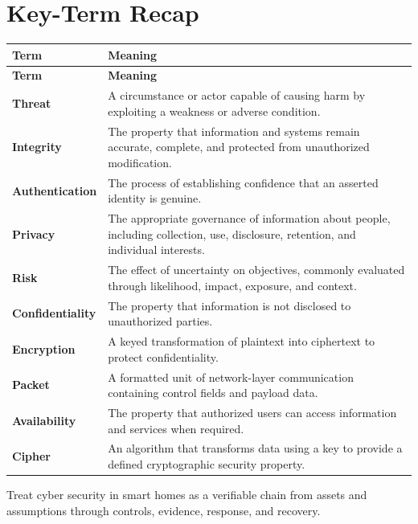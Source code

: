 \documentclass[11pt]{article}
\begin{document}
\section*{Key-Term Recap}
\begin{longtable}{>{\RaggedRight\arraybackslash}p{}>{\RaggedRight\arraybackslash}p{}}
\toprule\rowcolor{Navy}\color{white}\textbf{Term} & \color{white}\textbf{Meaning}\\\midrule
\endfirsthead
\toprule\rowcolor{Navy}\color{white}\textbf{Term} & \color{white}\textbf{Meaning}\\\midrule
\endhead
\textbf{Threat} & A circumstance or actor capable of causing harm by exploiting a weakness or adverse condition. \\\midrule
\textbf{Integrity} & The property that information and systems remain accurate, complete, and protected from unauthorized modification. \\\midrule
\textbf{Authentication} & The process of establishing confidence that an asserted identity is genuine. \\\midrule
\textbf{Privacy} & The appropriate governance of information about people, including collection, use, disclosure, retention, and individual interests. \\\midrule
\textbf{Risk} & The effect of uncertainty on objectives, commonly evaluated through likelihood, impact, exposure, and context. \\\midrule
\textbf{Confidentiality} & The property that information is not disclosed to unauthorized parties. \\\midrule
\textbf{Encryption} & A keyed transformation of plaintext into ciphertext to protect confidentiality. \\\midrule
\textbf{Packet} & A formatted unit of network-layer communication containing control fields and payload data. \\\midrule
\textbf{Availability} & The property that authorized users can access information and services when required. \\\midrule
\textbf{Cipher} & An algorithm that transforms data using a key to provide a defined cryptographic security property. \\\midrule
\bottomrule
\end{longtable}
\begin{takeawaybox}
Treat cyber security in smart homes as a verifiable chain from assets and assumptions through controls, evidence, response, and recovery.
\end{takeawaybox}
\end{document}
